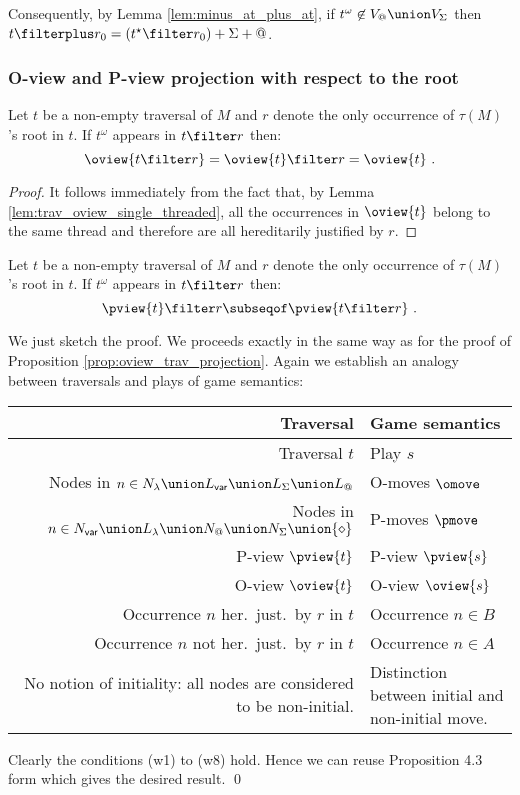 Consequently, by Lemma \ref{lem:minus_at_plus_at}, if $t^\omega
\not\in V_@ \union V_\Sigma$ then $t \filterplus r_0 =
(t^\star\filter r_0) +\Sigma+@$.



\subsubsection{O-view and P-view projection with respect to the root}

\begin{lemma}
\label{lem:oviewproj_wrt_theroot}
Let $t$ be a non-empty traversal of $M$
and $r$ denote the only occurrence of $\tau(M)$'s root in $t$. If
$t^\omega$ appears in $t\filter r$ then:
$$\oview{t\filter r} = \oview{t}\filter r = \oview{t} \ .$$
\end{lemma}
\begin{proof}
It follows immediately from the fact that, by Lemma \ref{lem:trav_oview_single_threaded}, all the occurrences in $\oview{t}$ belong to the same thread and therefore are all hereditarily justified by $r$.
\end{proof}

\begin{lemma}
\label{lem:pviewproj_wrt_theroot}
Let $t$ be a non-empty traversal of $M$ and $r$ denote the only occurrence of $\tau(M)$'s
root in $t$. If $t^\omega$ appears in $t\filter r$ then:
$$ \pview{t} \filter r \subseqof \pview{t \filter r} \  .$$
\end{lemma}
\proof We just sketch the proof. We proceeds exactly in the same way
as for the proof of Proposition \ref{prop:oview_trav_projection}.
Again we establish an analogy between traversals and plays of game
semantics:
\begin{center}
\begin{tabular}{r|p{5cm}}
{Traversal} & {Game semantics} \\
\hline
Traversal $t$ & Play $s$ \\
Nodes in $n \in N_\lambda \union L_{\sf var} \union L_\Sigma \union L_@$ & O-moves $\omove$ \\
Nodes in $n \in N_{\sf var} \union L_\lambda \union N_@ \union N_\Sigma \union \{\diamond\}$ & P-moves $\pmove$\\
P-view $\pview{t}$  & P-view $\pview{s}$\\
O-view $\oview{t}$  & O-view $\oview{s}$\\
Occurrence $n$ her.\ just.\ by $r$ in $t$ & Occurrence $n \in B$ \\
Occurrence $n$ not her.\ just.\ by $r$ in $t$ & Occurrence $n \in A$ \\
\parbox[t]{6cm}{\raggedleft No notion of initiality: all nodes are considered to be non-initial.} & Distinction between initial and non-initial move.
\end{tabular}
\end{center}
Clearly the conditions (w1) to (w8) hold. Hence we can reuse Proposition 4.3 form \cite{hylandong_pcf} which gives the desired result. \qed
\bigskip

